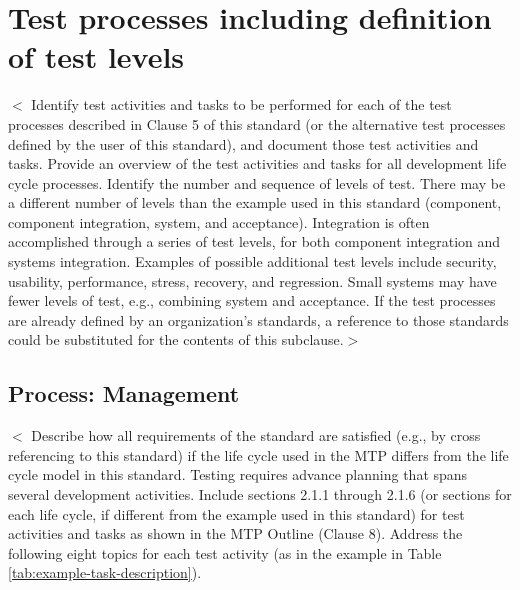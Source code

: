 \documentclass{scrreprt}
\begin{document}
\section{Test processes including definition of test levels}
$<$ Identify test activities and tasks to be performed for each of the test processes described in Clause 5 of this standard (or the alternative test processes defined by the user of this standard), and document those test activities and tasks. Provide an overview of the test activities and tasks for all development life cycle processes. Identify the number and sequence of levels of test. There may be a different number of levels than the example used in this standard (component, component integration, system, and acceptance). Integration is often accomplished through a series of test levels, for both component integration and systems integration. Examples of possible additional test levels include security, usability, performance, stress, recovery, and regression. Small systems may have fewer levels of test, e.g., combining system and acceptance. If the test processes are already defined by an organization’s standards, a reference to those standards could be substituted for the contents of this subclause.$>$

	\subsection{Process: Management}
	$<$ Describe how all requirements of the standard are satisfied (e.g., by cross referencing to this standard) if the life cycle used in the MTP differs from the life cycle model in this standard. Testing requires advance planning that spans several development activities. Include sections 2.1.1 through 2.1.6 (or sections for each life cycle, if different from the example used in this standard) for test activities and tasks as shown in the MTP Outline (Clause 8). 
	Address the following eight topics for each test activity (as in the example in Table \ref{tab:example-task-description}).
	
\end{document}
